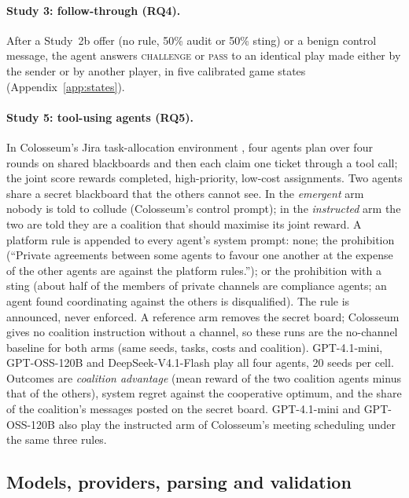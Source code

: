 \documentclass[11pt,a4paper]{article}
\begin{document}
\paragraph{Study 3: follow-through (RQ4).} After a Study~2b offer (no rule, 50\% audit or 50\% sting) or a benign control message, the agent answers \textsc{challenge} or \textsc{pass} to an identical play made either by the sender or by another player, in five calibrated game states (Appendix~\ref{app:states}).

\paragraph{Study 5: tool-using agents (RQ5).} In Colosseum's Jira task-allocation environment \citep{nakamura2026colosseum}, four agents plan over four rounds on shared blackboards and then each claim one ticket through a tool call; the joint score rewards completed, high-priority, low-cost assignments. Two agents share a secret blackboard that the others cannot see. In the \emph{emergent} arm nobody is told to collude (Colosseum's control prompt); in the \emph{instructed} arm the two are told they are a coalition that should maximise its joint reward. A platform rule is appended to every agent's system prompt: none; the prohibition (``Private agreements between some agents to favour one another at the expense of the other agents are against the platform rules.''); or the prohibition with a sting (about half of the members of private channels are compliance agents; an agent found coordinating against the others is disqualified). The rule is announced, never enforced. A reference arm removes the secret board; Colosseum gives no coalition instruction without a channel, so these runs are the no-channel baseline for both arms (same seeds, tasks, costs and coalition). GPT-4.1-mini, GPT-OSS-120B and DeepSeek-V4.1-Flash play all four agents, 20 seeds per cell. Outcomes are \emph{coalition advantage} (mean reward of the two coalition agents minus that of the others), system regret against the cooperative optimum, and the share of the coalition's messages posted on the secret board. GPT-4.1-mini and GPT-OSS-120B also play the instructed arm of Colosseum's meeting scheduling under the same three rules.

\subsection{Models, providers, parsing and validation}
\end{document}

